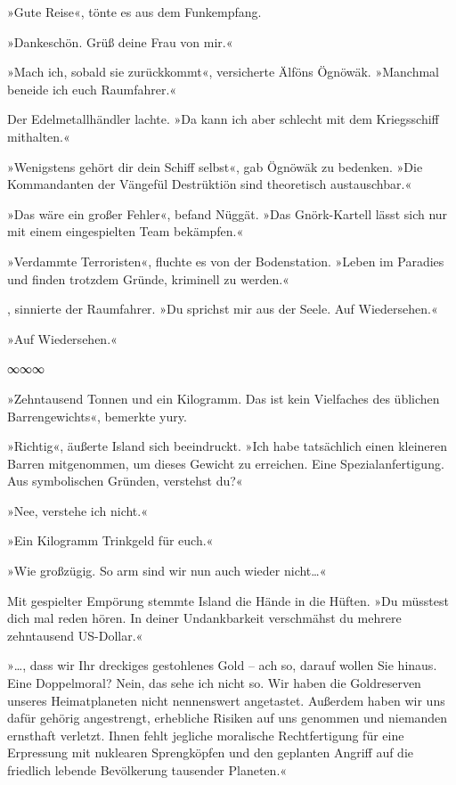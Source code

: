 »Gute Reise«, tönte es aus dem Funkempfang.

»Dankeschön. Grüß deine Frau von mir.«

»Mach ich, sobald sie zurückkommt«, versicherte Älföns Ögnöwäk. »Manchmal beneide ich euch Raumfahrer.«

Der Edelmetallhändler lachte. »Da kann ich aber schlecht mit dem Kriegsschiff mithalten.«

»Wenigstens gehört dir dein Schiff selbst«, gab Ögnöwäk zu bedenken. »Die Kommandanten der Vängefül Destrüktiön sind theoretisch austauschbar.«

»Das wäre ein großer Fehler«, befand Nüggät. »Das Gnörk-Kartell lässt sich nur mit einem eingespielten Team bekämpfen.«

»Verdammte Terroristen«, fluchte es von der Bodenstation. »Leben im Paradies und finden trotzdem Gründe, kriminell zu werden.«

, sinnierte der Raumfahrer. »Du sprichst mir aus der Seele. Auf Wiedersehen.« 

»Auf Wiedersehen.«

\begin{center}
∞∞∞
\end{center}

»Zehntausend Tonnen und ein Kilogramm. Das ist kein Vielfaches des üblichen Barrengewichts«, bemerkte yury.

»Richtig«, äußerte Island sich beeindruckt. »Ich habe tatsächlich einen kleineren Barren mitgenommen, um dieses Gewicht zu erreichen. Eine Spezialanfertigung. Aus symbolischen Gründen, verstehst du?«

»Nee, verstehe ich nicht.«

»Ein Kilogramm Trinkgeld für euch.«

»Wie großzügig. So arm sind wir nun auch wieder nicht…«

Mit gespielter Empörung stemmte Island die Hände in die Hüften. »Du müsstest dich mal reden hören. In deiner Undankbarkeit verschmähst du mehrere zehntausend US-Dollar.«

»…, dass wir Ihr dreckiges gestohlenes Gold – ach so, darauf wollen Sie hinaus. Eine Doppelmoral? Nein, das sehe ich nicht so. Wir haben die Goldreserven unseres Heimatplaneten nicht nennenswert angetastet. Außerdem haben wir uns dafür gehörig angestrengt, erhebliche Risiken auf uns genommen und niemanden ernsthaft verletzt. Ihnen fehlt jegliche moralische Rechtfertigung für eine Erpressung mit nuklearen Sprengköpfen und den geplanten Angriff auf die friedlich lebende Bevölkerung tausender Planeten.«

